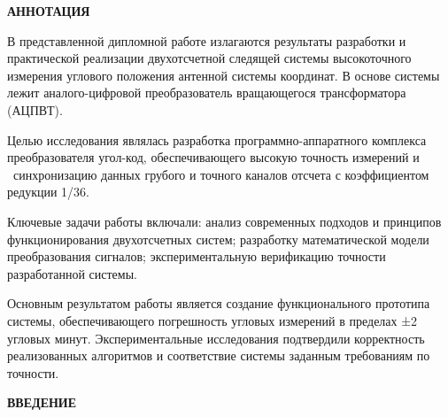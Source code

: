 \newpage
\begin{center}
  \textbf{\large АННОТАЦИЯ}
\end{center}



В представленной дипломной работе излагаются результаты разработки и практической реализации двухотсчетной 
следящей системы высокоточного измерения углового положения антенной системы координат. В основе системы лежит аналого-цифровой 
преобразователь вращающегося трансформатора (АЦПВТ).

Целью исследования являлась разработка программно-аппаратного комплекса преобразователя угол-код, обеспечивающего высокую точность измерений и \
синхронизацию данных грубого и точного каналов отсчета с коэффициентом редукции 1/36.

Ключевые задачи работы включали: анализ современных подходов и принципов функционирования двухотсчетных систем; 
разработку математической модели преобразования сигналов; экспериментальную верификацию точности разработанной системы.

Основным результатом работы является создание функционального прототипа системы, обеспечивающего погрешность угловых измерений 
в пределах ±2 угловых минут. Экспериментальные исследования подтвердили корректность реализованных алгоритмов и соответствие системы заданным 
требованиям по точности.


\onehalfspacing
\setcounter{page}{2}

\newpage
\renewcommand{\contentsname}{\centerline{\large СОДЕРЖАНИЕ}}
\tableofcontents

\newpage
\begin{center}
  \textbf{\large ВВЕДЕНИЕ}
\end{center}


